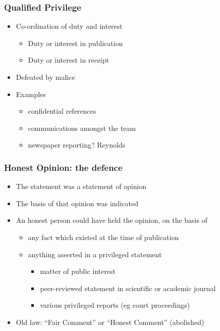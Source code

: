 \documentclass[ignorenonframetext,]{beamer}
\begin{document}
\begin{frame}
\frametitle{Qualified Privilege}

\begin{itemize}
\item  Co-ordination of duty and interest

  \begin{itemize}
  \item    Duty or interest in publication
  \item    Duty or interest in receipt
  \end{itemize}
\item  Defeated by {malice}
\item  Examples

  \begin{itemize}
  \item    confidential references
  \item    communications amongst the team
  \item    newspaper reporting? {Reynolds}
  \end{itemize}
\end{itemize}
\end{frame}

\begin{frame}
\frametitle{Honest Opinion: the defence}

\begin{itemize}
\item The statement was a statement of opinion 
\item The basis of that opinion was indicated
\item An honest person could have held the opinion, on the basis of
  \begin{itemize}
  \item any fact which existed at the time of publication
  \item anything asserted in a privileged statement
    \begin{itemize}
    \item matter of public interest
    \item peer-reviewed statement in scientific or academic journal
    \item various privileged reports (eg court proceedings)
    \end{itemize}
  \end{itemize}
\item Old law: ``Fair Comment'' or ``Honest Comment'' (abolished)
\end{itemize}
\end{frame}
\end{document}

